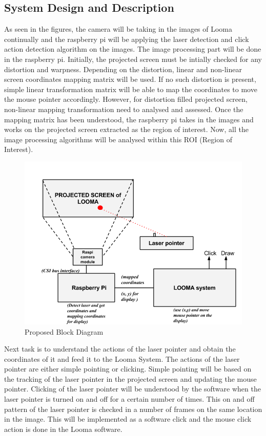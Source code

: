 \documentclass[12pt, a4paper]{article}
\begin{document}
\subsection{System Design and Description}
As seen in the figures, the camera will be taking in the images of Looma continually and the raspberry pi will be applying the laser detection and click action detection algorithm on the images. The image processing part will be done in the raspberry pi. Initially, the projected screen must be intially checked for any distortion and warpness. Depending on the distortion, linear and non-linear screen coordinates mapping matrix will be used. If no such distortion is present, simple linear transformation matrix will be able to map the coordinates to move the mouse pointer accordingly. However, for distortion filled projected screen, non-linear mapping transformation need to analysed and assessed. Once the mapping matrix has been understood, the raspberry pi takes in the images and works on the projected screen extracted as the region of interest. Now, all the image processing algorithms will be analysed within this ROI (Region of Interest).

\begin{figure}[htp]
\includegraphics[scale=0.5]{proposed_system}
\caption{Proposed Block Diagram}
\label{Proposed Block Diagram}
\end{figure}

Next task is to understand the actions of the laser pointer and obtain the coordinates of it and feed it to the Looma System. The actions of the laser pointer are either simple pointing or clicking. Simple pointing will be based on the tracking of the laser pointer in the projected screen and updating the mouse pointer. Clicking of the laser pointer will be understood by the software when the laser pointer is turned on and off for a certain number of times. This on and off pattern of the laser pointer is checked in a number of frames on the same location in the image. This will be implemented as a software click and the mouse click action is done in the Looma software. 
\end{document}
